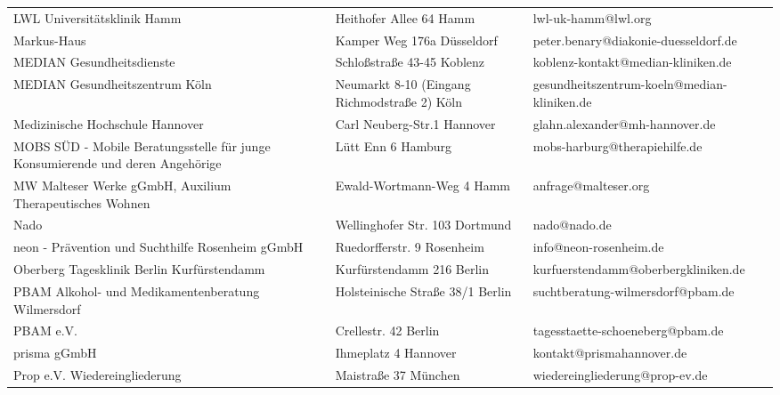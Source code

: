 {\begin{xltabular}{\textwidth} {
 >{\raggedright\arraybackslash}p{5cm}
 >{\raggedright\arraybackslash}X
 >{\raggedright\arraybackslash}p{5cm} }
LWL Universitätsklinik Hamm & Heithofer Allee 64 Hamm & lwl-uk-hamm@lwl.org \\
Markus-Haus & Kamper Weg 176a Düsseldorf & peter.benary@diakonie-duesseldorf.de \\
MEDIAN Gesundheitsdienste & Schloßstraße 43-45 Koblenz & koblenz-kontakt@median-kliniken.de \\
MEDIAN Gesundheitszentrum Köln & Neumarkt 8-10 (Eingang Richmodstraße 2) Köln & gesundheitszentrum-koeln@median-kliniken.de \\
Medizinische Hochschule Hannover & Carl Neuberg-Str.1 Hannover & glahn.alexander@mh-hannover.de \\
MOBS SÜD - Mobile Beratungsstelle für junge Konsumierende und deren Angehörige & Lütt Enn 6 Hamburg & mobs-harburg@therapiehilfe.de \\
MW Malteser Werke gGmbH, Auxilium Therapeutisches Wohnen & Ewald-Wortmann-Weg 4 Hamm & anfrage@malteser.org \\
Nado & Wellinghofer Str. 103 Dortmund & nado@nado.de \\
neon - Prävention und Suchthilfe Rosenheim gGmbH & Ruedorfferstr. 9 Rosenheim & info@neon-rosenheim.de \\
Oberberg Tagesklinik Berlin Kurfürstendamm & Kurfürstendamm 216 Berlin & kurfuerstendamm@oberbergkliniken.de \\
PBAM Alkohol- und Medikamentenberatung Wilmersdorf & Holsteinische Straße 38/1 Berlin & suchtberatung-wilmersdorf@pbam.de \\
PBAM e.V. & Crellestr. 42 Berlin & tagesstaette-schoeneberg@pbam.de \\
prisma gGmbH & Ihmeplatz 4 Hannover & kontakt@prismahannover.de \\
Prop e.V. Wiedereingliederung & Maistraße 37 München & wiedereingliederung@prop-ev.de \\

\end{xltabular}}
